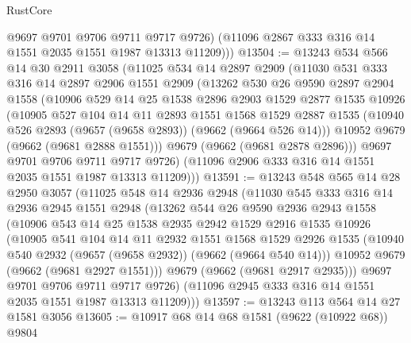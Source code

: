 \begin{lexlean}{RustCore}
\begin{coremodule}
          @9697
          @9701
          @9706
          @9711
          @9717
          @9726)
        (@11096 @2867 @333 @316 @14 @1551 @2035 @1551 @1987 @13313 @11209)))
@13504 := @13243
    @534
    @566
    @14
    @30
    @2911
    @3058
    (@11025
      @534
      @14
      @2897
      @2909
      (@11030
        @531
        @333
        @316
        @14
        @2897
        @2906
        @1551
        @2909
        (@13262
          @530
          @26
          @9590
          @2897
          @2904
          @1558
          (@10906
            @529
            @14
            @25
            @1538
            @2896
            @2903
            @1529
            @2877
            @1535
            @10926
            (@10905
              @527
              @104
              @14
              @11
              @2893
              @1551
              @1568
              @1529
              @2887
              @1535
              (@10940 @526 @2893 (@9657 (@9658 @2893)) (@9662 (@9664 @526 @14)))
              @10952
              @9679
              (@9662 (@9681 @2888 @1551)))
            @9679
            (@9662 (@9681 @2878 @2896)))
          @9697
          @9701
          @9706
          @9711
          @9717
          @9726)
        (@11096 @2906 @333 @316 @14 @1551 @2035 @1551 @1987 @13313 @11209)))
@13591 := @13243
    @548
    @565
    @14
    @28
    @2950
    @3057
    (@11025
      @548
      @14
      @2936
      @2948
      (@11030
        @545
        @333
        @316
        @14
        @2936
        @2945
        @1551
        @2948
        (@13262
          @544
          @26
          @9590
          @2936
          @2943
          @1558
          (@10906
            @543
            @14
            @25
            @1538
            @2935
            @2942
            @1529
            @2916
            @1535
            @10926
            (@10905
              @541
              @104
              @14
              @11
              @2932
              @1551
              @1568
              @1529
              @2926
              @1535
              (@10940 @540 @2932 (@9657 (@9658 @2932)) (@9662 (@9664 @540 @14)))
              @10952
              @9679
              (@9662 (@9681 @2927 @1551)))
            @9679
            (@9662 (@9681 @2917 @2935)))
          @9697
          @9701
          @9706
          @9711
          @9717
          @9726)
        (@11096 @2945 @333 @316 @14 @1551 @2035 @1551 @1987 @13313 @11209)))
@13597 := @13243 @113 @564 @14 @27 @1581 @3056
@13605 := @10917 @68 @14 @68 @1581 (@9622 (@10922 @68)) @9804

\end{coremodule}
\end{lexlean}
